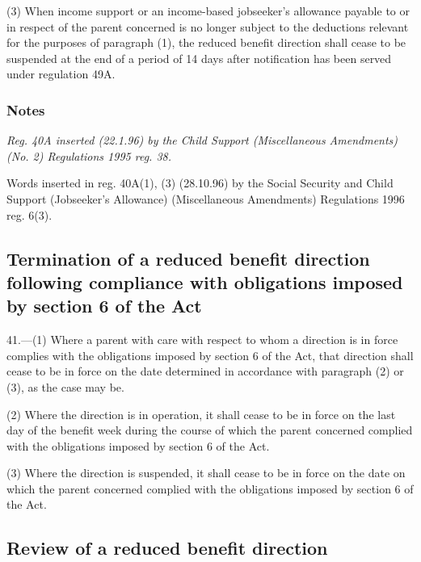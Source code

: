 \documentclass[a4paper]{article}
\newcommand\amendment[1]{\subsubsection*{Notes}{\itshape\frenchspacing\footnotesize #1 \par}}
\begin{document}
(3) When income support 
or an income-based jobseeker’s allowance  %
payable to or in respect of the parent concerned is no longer subject to the deductions relevant for the purposes of paragraph (1), the reduced benefit direction shall cease to be suspended at the end of a period of 14 days after notification has been served under regulation 49A.

\amendment{
Reg. 40A inserted (22.1.96) by the Child Support (Miscellaneous Amendments) (No. 2) Regulations 1995 reg. 38.

Words inserted in reg. 40A(1), (3) (28.10.96) by the Social Security and Child Support (Jobseeker's Allowance) (Miscellaneous Amendments) Regulations 1996 reg. 6(3).
}

\subsection[41. Termination of a reduced benefit direction following compliance with obligations imposed by section 6 of the Act]{Termination of a reduced benefit direction following compliance with obligations imposed by section 6 of the Act}

41.—(1) Where a parent with care with respect to whom a direction is in force complies with the obligations imposed by section 6 of the Act, that direction shall cease to be in force on the date determined in accordance with paragraph (2) or (3), as the case may be.

(2) Where the direction is in operation, it shall cease to be in force on the last day of the benefit week during the course of which the parent concerned complied with the obligations imposed by section 6 of the Act.

(3) Where the direction is suspended, it shall cease to be in force on the date on which the parent concerned complied with the obligations imposed by section 6 of the Act.

\subsection[42. Review of a reduced benefit direction]{Review of a reduced benefit direction}
\end{document}
